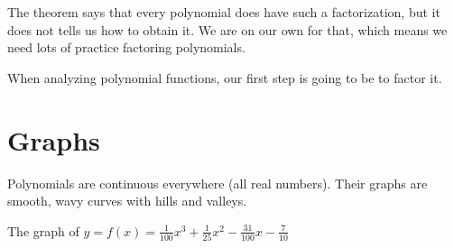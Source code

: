 \documentclass{ximera}
\begin{document}
The theorem says that every polynomial does have such a factorization, but it does not tells us how to obtain it.  We are on our own for that, which means we need lots of practice factoring polynomials.

When analyzing polynomial functions, our first step is going to be to factor it.





\section {Graphs}




Polynomials are continuous everywhere (all real numbers).  Their graphs are smooth, wavy curves with hills and valleys.



\begin{example}


The graph of $y = f(x) = \frac{1}{100} x^3 + \frac{1}{25} x^2 - \frac{31}{100} x - \frac{7}{10}$


\begin{image}
\end{image}

\end{example}
\end{document}
